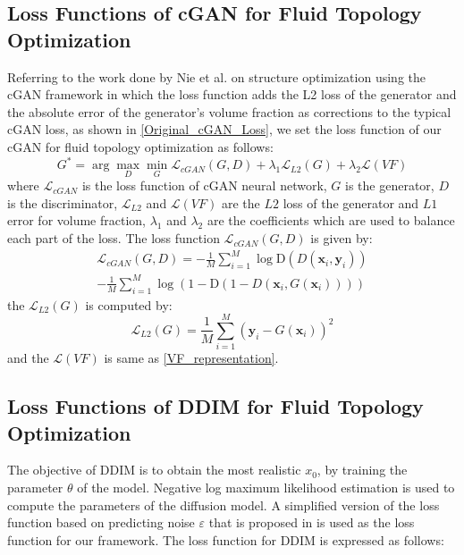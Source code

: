 \documentclass{article}
\begin{document}
\subsection{Loss Functions of cGAN for Fluid Topology Optimization}
Referring to the work done by Nie et al. on structure optimization using the cGAN framework \cite{1-TopoGAN-nie2021topologygan} in which the loss function adds the L2 loss of the generator and the absolute error of the generator's volume fraction as corrections to the typical cGAN loss, as shown in \eqref{Original_cGAN_Loss}, we set the loss function of our cGAN for fluid topology optimization as follows:
\begin{equation}
G^*=\arg \max _D \min _G \mathcal{L}_{cGAN}(G, D) +\lambda_1 \mathcal{L}_{L 2}(G)+\lambda_2 \mathcal{L}(VF)
\end{equation}
where $\mathcal{L}_{cGAN}$ is the loss function of cGAN neural network,   $G$ is the generator, $D$ is the discriminator, $\mathcal{L}_{L 2}$ and $\mathcal{L}(VF)$ are the $L2$ loss of the generator and $L1$ error for volume fraction, $\lambda_1$ and  $\lambda_2$ are the coefficients which are used to balance each part of the loss. The loss function  $\mathcal{L}_{cGAN}(G, D)$  is given by:
\begin{multline}
\mathcal{L}_{cGAN}(G, D)=-\frac{1}{M} \sum_{i=1}^{M} \log \mathrm{D}\left(D(\mathbf{x}_i, \mathbf{y}_i)\right) \\
-\frac{1}{M} \sum_{i=1}^{M} \log \left(1-\mathrm{D}\left(1- D(\mathbf{x}_i, G(\mathbf{x}_i))\right)\right)
\end{multline}
the $\mathcal{L}_{L2}(G)$ is computed by:
\begin{equation}
\mathcal{L}_{L2}(G)=\frac{1}{M} \sum_{i=1}^M\left(\mathbf{y}_{i}-G(\mathbf{x}_i)\right)^2
\end{equation}
and the $\mathcal{L}(VF)$ is same as  \eqref{VF_representation}.


\subsection{Loss Functions of DDIM for Fluid Topology Optimization}
The objective of DDIM is to obtain the most realistic $x_0$, by training the parameter $\theta$ of the model. Negative log maximum likelihood estimation is used to compute the parameters of the diffusion model.  A simplified version of the loss function based on predicting noise $\varepsilon$ that is proposed in \cite{Dif-1-cD-ho2020denoising}    is used as the loss function for our framework. The loss function for DDIM is expressed as follows:
\end{document}
